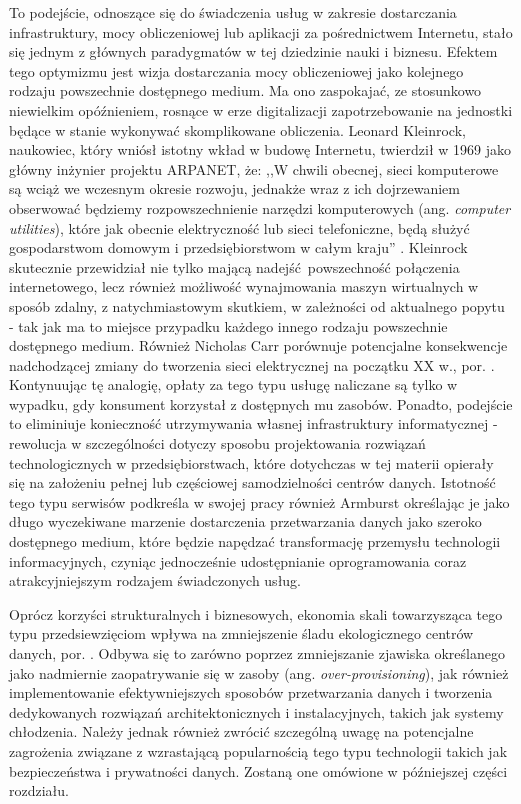 \documentclass[12pt,a4paper,twoside]{article}
\begin{document}
To podejście, odnoszące się do świadczenia usług w zakresie dostarczania infrastruktury, mocy obliczeniowej lub aplikacji za pośrednictwem Internetu, stało się jednym z głównych paradygmatów w tej dziedzinie nauki i biznesu. Efektem tego optymizmu jest wizja dostarczania mocy obliczeniowej jako kolejnego rodzaju powszechnie dostępnego medium. Ma ono zaspokajać, ze stosunkowo niewielkim opóźnieniem, rosnące w erze digitalizacji zapotrzebowanie na jednostki będące w stanie wykonywać skomplikowane obliczenia. Leonard Kleinrock, naukowiec, który wniósł istotny wkład w budowę Internetu, twierdził w 1969 jako główny inżynier projektu ARPANET, że: ,,W chwili obecnej, sieci komputerowe są wciąż we wczesnym okresie rozwoju, jednakże wraz z ich dojrzewaniem obserwować będziemy rozpowszechnienie narzędzi komputerowych (ang. \textit{computer utilities}), które jak obecnie elektryczność lub sieci telefoniczne, będą służyć gospodarstwom domowym i przedsiębiorstwom w całym kraju''  \citep{kleinrock2005}. Kleinrock skutecznie przewidział nie tylko mającą nadejść powszechność połączenia internetowego, lecz również możliwość wynajmowania maszyn wirtualnych w sposób zdalny, z natychmiastowym skutkiem, w zależności od aktualnego popytu - tak jak ma to miejsce przypadku każdego innego rodzaju powszechnie dostępnego medium. Również Nicholas Carr porównuje potencjalne konsekwencje nadchodzącej zmiany do tworzenia sieci elektrycznej na początku XX w., por. \citet{carr2008}. Kontynuując tę analogię, opłaty za tego typu usługę naliczane są tylko w wypadku, gdy konsument korzystał z dostępnych mu zasobów. Ponadto, podejście to eliminiuje konieczność utrzymywania własnej infrastruktury informatycznej - rewolucja w szczególności dotyczy sposobu projektowania rozwiązań technologicznych w przedsiębiorstwach, które dotychczas w tej materii opierały się na założeniu pełnej lub częściowej samodzielności centrów danych. Istotność tego typu serwisów podkreśla w swojej pracy również Armburst \citep{armburst2010} określając je jako długo wyczekiwane marzenie dostarczenia przetwarzania danych jako szeroko dostępnego medium, które będzie napędzać transformację przemysłu technologii informacyjnych, czyniąc jednocześnie udostępnianie oprogramowania coraz atrakcyjniejszym rodzajem świadczonych usług.

Oprócz korzyści strukturalnych i biznesowych, ekonomia skali towarzysząca tego typu przedsiewzięciom wpływa na zmniejszenie śladu ekologicznego centrów danych, por. \citet{oecd2014}. Odbywa się to zarówno poprzez zmniejszanie zjawiska określanego jako nadmiernie zaopatrywanie się w zasoby (ang. \textit{over-provisioning}), jak również implementowanie efektywniejszych sposobów przetwarzania danych i tworzenia dedykowanych rozwiązań architektonicznych i instalacyjnych, takich jak systemy chłodzenia. Należy jednak również zwrócić szczególną uwagę na potencjalne zagrożenia związane z wzrastającą popularnością tego typu technologii takich jak bezpieczeństwa i prywatności danych. Zostaną one omówione w późniejszej części rozdziału.
\end{document}
